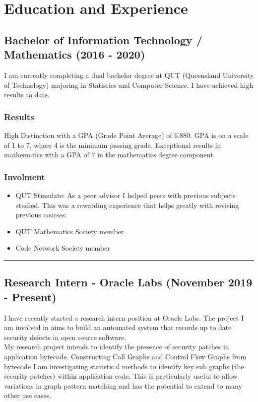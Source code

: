 \section*{Education and Experience}
\subsection*{Bachelor of Information Technology / Mathematics (2016 - 2020)}

I am currently completing a dual bachelor degree at QUT (Queensland University of Technology) majoring in Statistics and Computer Science. I have achieved high results to date.

\subsubsection*{Results}

High Distinction with a GPA (Grade Point Average) of 6.880. GPA is on a scale of 1 to 7, where 4 is the minimum passing grade. Exceptional results in mathematics with a GPA of 7 in the mathematics degree component.

\subsubsection*{Involment}

\begin{itemize}
  \setlength\itemsep{0.1em}
  \item QUT Stimulate: As a peer advisor I helped peers with previous subjects studied. This was a rewarding experience that helps greatly with revising previous courses.
  \item QUT Mathematics Society member
  \item Code Network Society member
\end{itemize}

\noindent\rule{\textwidth}{0.5pt}

\subsection*{Research Intern - Oracle Labs (November 2019 - Present)}

I have recently started a research intern position at Oracle Labs. The project I am involved in aims to build an automated system that records up to date security defects in open source software.\\
My research project intends to identify the presence of security patches in application bytecode. Constructing Call Graphs and Control Flow Graphs from bytecode I am investigating statistical methods to identify key sub graphs (the security patches) within application code. This is particularly useful to allow variations in graph pattern matching and has the potential to extend to many other use cases.

